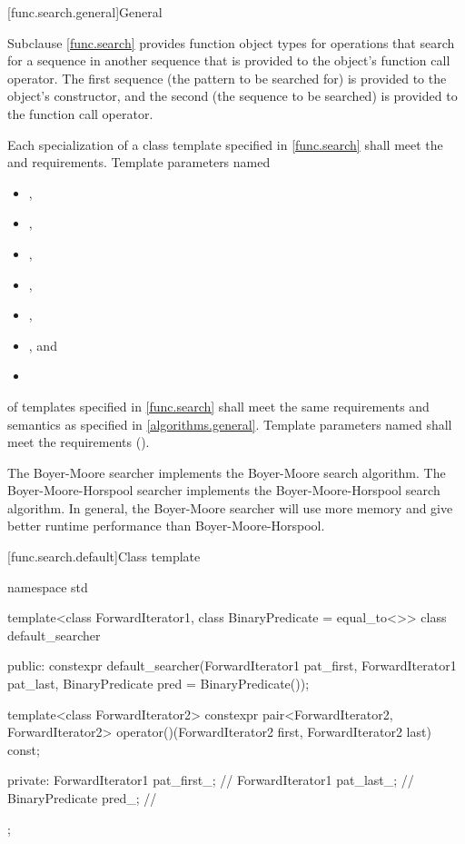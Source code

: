 [func.search.general]{General}

\pnum
Subclause \ref{func.search} provides function object types for
operations that search for a sequence  in another
sequence  that is provided to the object's function call
operator.  The first sequence (the pattern to be searched for) is provided to
the object's constructor, and the second (the sequence to be searched) is
provided to the function call operator.

\pnum
Each specialization of a class template specified in \ref{func.search}
shall meet the  and  requirements.
Template parameters named
\begin{itemize}
\item {},
\item {},
\item {},
\item {},
\item {},
\item {}, and
\item {}
\end{itemize}
of templates specified in
\ref{func.search} shall meet the same requirements and semantics as
specified in \ref{algorithms.general}.
Template parameters named  shall meet the 
requirements ().

\pnum
The Boyer-Moore searcher implements the Boyer-Moore search algorithm.
The Boyer-Moore-Horspool searcher implements the Boyer-Moore-Horspool search algorithm.
In general, the Boyer-Moore searcher will use more memory and give better runtime performance than Boyer-Moore-Horspool.

[func.search.default]{Class template }

%
\begin{codeblock}
namespace std {
  template<class ForwardIterator1, class BinaryPredicate = equal_to<>>
  class default_searcher {
  public:
    constexpr default_searcher(ForwardIterator1 pat_first, ForwardIterator1 pat_last,
                               BinaryPredicate pred = BinaryPredicate());

    template<class ForwardIterator2>
      constexpr pair<ForwardIterator2, ForwardIterator2>
        operator()(ForwardIterator2 first, ForwardIterator2 last) const;

  private:
    ForwardIterator1 pat_first_;        // \expos
    ForwardIterator1 pat_last_;         // \expos
    BinaryPredicate pred_;              // \expos
  };
}
\end{codeblock}


